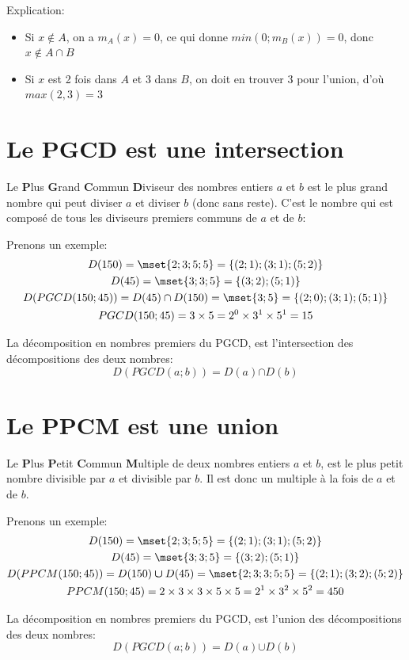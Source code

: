 Explication: 
\begin{itemize}
    \item Si $x \notin A$, on a $m_A(x)=0$, ce qui donne $min(0; m_B(x))=0$, donc $x \notin A \cap B$
    \item Si $x$ est 2 fois dans $A$ et 3 dans $B$, on doit en trouver 3 pour l'union, d'où $max(2, 3)=3$
\end{itemize}

\section{Le PGCD est une intersection}

Le \textbf{P}lus \textbf{G}rand \textbf{C}ommun \textbf{D}iviseur des nombres entiers $a$ et $b$ est le plus grand nombre qui peut diviser $a$ et diviser $b$ (donc sans reste). C'est le nombre qui est composé de tous les diviseurs premiers communs de $a$ et de $b$:
   
Prenons un exemple:
\begin{gather*}  
    D(150)=\mset{2;3;5;5} = \{(2;1);(3;1);(5;2)\}\\
    D(45)=\mset{3;3;5} = \{(3;2);(5;1)\}\\
    D(PGCD(150; 45)) = D(45) \cap D(150)=\mset{3;5} = \{(2;0);(3;1);(5;1)\}\\
    PGCD(150; 45) = 3 \times 5 = 2^0 \times 3^1 \times 5^1 = 15
\end{gather*}

La décomposition en nombres premiers du PGCD, est l'intersection des décompositions des deux nombres:
\[\boxed{D(PGCD(a; b)) = D(a) \boldsymbol{\cap} D(b)}\]

\section{Le PPCM est une union}
Le \textbf{P}lus \textbf{P}etit \textbf{C}ommun \textbf{M}ultiple de deux nombres entiers $a$ et $b$, est le plus petit nombre divisible par $a$ et divisible par $b$. Il est donc un multiple à la fois de $a$ et de $b$.

Prenons un exemple:
\begin{gather*}  
    D(150)=\mset{2;3;5;5}=\{(2;1);(3;1);(5;2)\} \\
    D(45)=\mset{3;3;5}=\{(3;2);(5;1)\} \\
    D(PPCM(150; 45)) = D(150) \boldsymbol{\cup} D(45) = \mset{2; 3; 3; 5; 5} = \{(2;1);(3;2);(5;2)\} \\
    \displaystyle PPCM(150; 45) = 2 \times 3 \times 3 \times 5 \times 5 = 2^1 \times 3^2 \times 5^2 =450
\end{gather*}

La décomposition en nombres premiers du PGCD, est l'union des décompositions des deux nombres:
\[\boxed{D(PGCD(a; b)) = D(a) \boldsymbol{\cup} D(b)}\]

